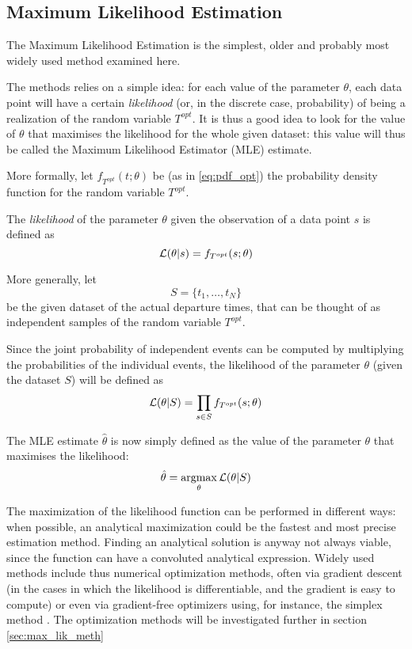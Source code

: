 \subsection{Maximum Likelihood Estimation}
\label{sec:max_lik}
The Maximum Likelihood Estimation is the simplest, older and probably most widely used method examined here.

The methods relies on a simple idea:
for each value of the parameter \(\theta\),
each data point will have a certain \textit{likelihood} (or, in the discrete case, probability) of being a realization of the random variable \(T^{opt}\).
It is thus a good idea to look for the value of \(\theta\) that maximises the likelihood for the whole given dataset:
this value will thus be called the Maximum Likelihood Estimator (MLE) estimate.

More formally, let \(f_{T^{opt}}(t; \theta)\) be (as in \eqref{eq:pdf_opt}) the probability density function for the random variable \(T^{opt}\).

The \textit{likelihood} of the parameter \(\theta\) given the observation of a data point \(s\) is defined as
\begin{equation}
  \label{eq:lik_one_point}
  \mathcal{L}(\theta | s)  = f_{T^{opt}}(s; \theta)
\end{equation}

More generally, let
\[S = \{t_1, \dots, t_N\}\]
be the given dataset of the actual departure times,
that can be thought of as independent samples of the random variable \(T^{opt}\).

Since the joint probability of independent events can be computed by multiplying the probabilities of the individual events,
the likelihood of the parameter \(\theta\) (given the dataset \(S\)) will be defined as
\begin{equation}
  \label{eq:lik_def}
  \mathcal{L}(\theta | S) = \prod_{s \in S} f_{T^{opt}}(s; \theta)
\end{equation}

The MLE estimate \(\hat{\theta}\) is now simply defined as the value of the parameter \(\theta\) that maximises the likelihood:
\begin{equation}
  \label{eq:mle_estimate}
  \hat{\theta} = \operatorname*{argmax}_\theta \mathcal{L}(\theta | S)
\end{equation}

The maximization of the likelihood function can be performed in different ways:
when possible, an analytical maximization could be the fastest and most precise estimation method.
Finding an analytical solution is anyway not always viable,
since the function can have a convoluted analytical expression.
Widely used methods include thus numerical optimization methods,
often via gradient descent
(in the cases in which the likelihood is differentiable, and the gradient is easy to compute)
or even via gradient-free optimizers using, for instance,
the simplex method \parencite{10.1093/comjnl/7.4.308}.
The optimization methods will be investigated further in section \ref{sec:max_lik_meth}


